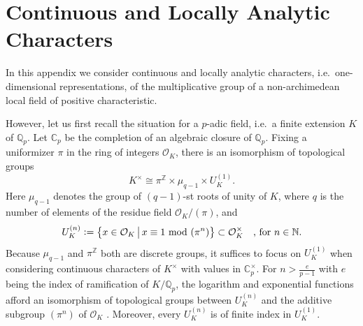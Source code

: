 \documentclass[a4paper, reqno, 10pt]{amsart}
\theoremstyle{definition}
\numberwithin{equation}{section}
\newcommand{\defeq}{\vcentcolon=}
\renewcommand{\mod}{{\,\,\mathrm{mod}\,\,}}
\newcommand{\unts}{^{\times}}
\newcommand{\BC}{{\mathbb {C}}}
\newcommand{\BN}{{\mathbb {N}}}
\newcommand{\BQ}{{\mathbb {Q}}}
\newcommand{\BZ}{{\mathbb {Z}}}
\newcommand{\CO}{{\mathcal {O}}}
\newcommand{\unif}{{\pi}}
\begin{document}
\vspace{3ex}


\newcommand{\upindex}[1]{{(#1)}}
\newcommand{\downindex}[1]{{(#1)}}
\newcommand{\ndivp}[1]{{p \hspace{1pt}\nmid\hspace{1pt} #1}}
\newcommand{\Nwithoutp}{{\BN_{p'}}}



\section{Continuous and Locally Analytic Characters}\label{Sect - Continuous and Locally Analytic Characters}



In this appendix we consider continuous and locally analytic characters, i.e.\ one-di\-men\-sion\-al representations, of the multiplicative group of a non-archimedean local field of positive characteristic.


However, let us first recall the situation for a $p$-adic field, i.e.\ a finite extension $K$ of $\BQ_p$.
Let $\BC_p$ be the completion of an algebraic closure of $\BQ_p$.
Fixing a uniformizer $\unif$ in the ring of integers $\CO_K$, there is an isomorphism of topological groups \cite[II.\ Satz 5.3]{Neukirch92AlgZahlenTh}
\begin{equation}\label{Eq A2 - Decomposition of units of local field}
	K\unts \cong \unif^\BZ \times \mu_{q-1} \times U_K^{(1)} .
\end{equation}
Here $\mu_{q-1}$ denotes the group of $(q-1)$-st roots of unity of $K$, where $q$ is the number of elements of the residue field $\CO_K/(\unif)$, and
\begin{equation*} 
	U_K^{(n)} \defeq \big\{ x \in \CO_K \,\big\vert\, x \equiv 1 \mod (\unif^n) \big\} \subset \CO_K\unts \quad\text{, for $n\in \BN$.}
\end{equation*}
Because $\mu_{q-1}$ and $\unif^\BZ$ both are discrete groups, it suffices to focus on $U_K^{(1)}$ when considering continuous characters of $K\unts$ with values in $\BC_p\unts$.
For $n > \frac{e}{p-1}$ with $e$ being the index of ramification of $K/\BQ_p$, the logarithm and exponential functions afford an isomorphism of topological groups between $U_K^{(n)}$ and the additive subgroup $(\unif^n)$ of $\CO_K$ \cite[II.\ Satz 5.5]{Neukirch92AlgZahlenTh}.
Moreover, every $U^{(n)}_K$ is of finite index in $U^{(1)}_K$.
\end{document}
